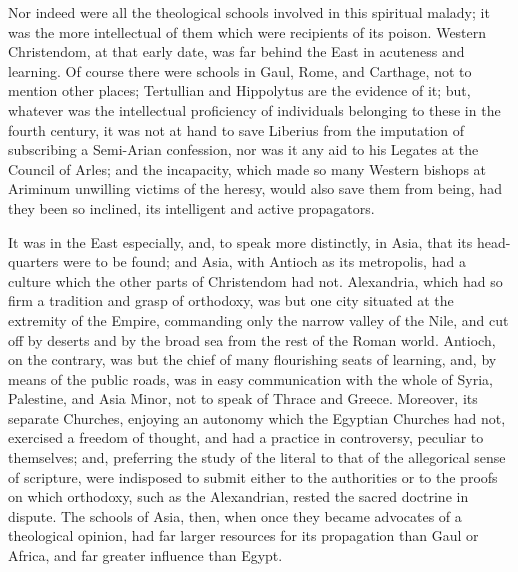 Nor indeed were all the theological schools involved in this
spiritual malady; it was the more intellectual of them which were
recipients of its poison. Western Christendom, at that early date, was
far behind the East in acuteness and learning. Of course there were
schools in Gaul, Rome, and Carthage, not to mention other places;
Tertullian and Hippolytus are the evidence of it; but, whatever was
the intellectual proficiency of individuals belonging to these in the
fourth century, it was not at hand to save Liberius from the
imputation of subscribing a Semi-Arian confession, nor was it any aid
to his Legates at the Council of Arles; and the incapacity, which made
so many Western bishops at Ariminum unwilling victims of the heresy,
would also save them from being, had they been so inclined, its
intelligent and active propagators.

It was in the East especially, and, to speak more distinctly, in
Asia, that its head-quarters were to be found; and Asia, with Antioch
as its metropolis, had a culture which the other parts of
Christendom had not. Alexandria, which had so firm a tradition and
grasp of orthodoxy, was but one city situated at the extremity of the
Empire, commanding only the narrow valley of the Nile, and cut off by
deserts and by the broad sea from the rest of the Roman world.
Antioch, on the contrary, was but the chief of many flourishing seats
of learning, and, by means of the public roads, was in easy
communication with the whole of Syria, Palestine, and Asia Minor, not
to speak of Thrace and Greece. Moreover, its separate Churches,
enjoying an autonomy which the Egyptian Churches had not, exercised a
freedom of thought, and had a practice in controversy, peculiar to
themselves; and, preferring the study of the literal to that of the
allegorical sense of scripture, were indisposed to submit either to
the authorities or to the proofs on which orthodoxy, such as the
Alexandrian, rested the sacred doctrine in dispute. The schools of
Asia, then, when once they became advocates of a theological opinion,
had far larger resources for its propagation than Gaul or Africa, and
far greater influence than Egypt.


